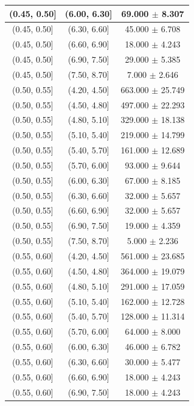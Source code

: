 \begin{longtable}{|c|c|c|}
\hline
(0.45, 0.50] & (6.00, 6.30] & 69.000 $\pm$ 8.307 \\ 
\hline
(0.45, 0.50] & (6.30, 6.60] & 45.000 $\pm$ 6.708 \\ 
\hline
(0.45, 0.50] & (6.60, 6.90] & 18.000 $\pm$ 4.243 \\ 
\hline
(0.45, 0.50] & (6.90, 7.50] & 29.000 $\pm$ 5.385 \\ 
\hline
(0.45, 0.50] & (7.50, 8.70] & 7.000 $\pm$ 2.646 \\ 
\hline
(0.50, 0.55] & (4.20, 4.50] & 663.000 $\pm$ 25.749 \\ 
\hline
(0.50, 0.55] & (4.50, 4.80] & 497.000 $\pm$ 22.293 \\ 
\hline
(0.50, 0.55] & (4.80, 5.10] & 329.000 $\pm$ 18.138 \\ 
\hline
(0.50, 0.55] & (5.10, 5.40] & 219.000 $\pm$ 14.799 \\ 
\hline
(0.50, 0.55] & (5.40, 5.70] & 161.000 $\pm$ 12.689 \\ 
\hline
(0.50, 0.55] & (5.70, 6.00] & 93.000 $\pm$ 9.644 \\ 
\hline
(0.50, 0.55] & (6.00, 6.30] & 67.000 $\pm$ 8.185 \\ 
\hline
(0.50, 0.55] & (6.30, 6.60] & 32.000 $\pm$ 5.657 \\ 
\hline
(0.50, 0.55] & (6.60, 6.90] & 32.000 $\pm$ 5.657 \\ 
\hline
(0.50, 0.55] & (6.90, 7.50] & 19.000 $\pm$ 4.359 \\ 
\hline
(0.50, 0.55] & (7.50, 8.70] & 5.000 $\pm$ 2.236 \\ 
\hline
(0.55, 0.60] & (4.20, 4.50] & 561.000 $\pm$ 23.685 \\ 
\hline
(0.55, 0.60] & (4.50, 4.80] & 364.000 $\pm$ 19.079 \\ 
\hline
(0.55, 0.60] & (4.80, 5.10] & 291.000 $\pm$ 17.059 \\ 
\hline
(0.55, 0.60] & (5.10, 5.40] & 162.000 $\pm$ 12.728 \\ 
\hline
(0.55, 0.60] & (5.40, 5.70] & 128.000 $\pm$ 11.314 \\ 
\hline
(0.55, 0.60] & (5.70, 6.00] & 64.000 $\pm$ 8.000 \\ 
\hline
(0.55, 0.60] & (6.00, 6.30] & 46.000 $\pm$ 6.782 \\ 
\hline
(0.55, 0.60] & (6.30, 6.60] & 30.000 $\pm$ 5.477 \\ 
\hline
(0.55, 0.60] & (6.60, 6.90] & 18.000 $\pm$ 4.243 \\ 
\hline
(0.55, 0.60] & (6.90, 7.50] & 18.000 $\pm$ 4.243 \\ 

\end{longtable}
